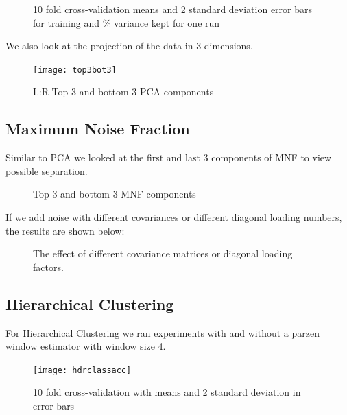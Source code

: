 \documentclass[conference,onecolumn]{IEEEtran}
\begin{document}
\begin{figure}[H]
	\centering
	\qquad
	\caption{10 fold cross-validation means and 2 standard deviation error bars for training and $\%$ variance kept for one run}
\end{figure}

We also look at the projection of the data in 3 dimensions.
\begin{figure}[H]
	\centering
	\texttt{[image: top3bot3]}
	\caption{L:R Top 3 and bottom 3 PCA components}
	\label{PCAEXP3D}
\end{figure}

\subsection{Maximum Noise Fraction}
Similar to PCA we looked at the first and last 3 components of MNF to view possible separation.

\begin{figure}[H]
	\centering
	\qquad
	\caption{Top 3 and bottom 3 MNF components}
\end{figure}

If we add noise with different covariances or different diagonal loading numbers, the results are shown below:
\begin{figure}[H]
	\centering
	\qquad
	\caption{The effect of different covariance matrices or diagonal loading factors. }
\end{figure}


\subsection{Hierarchical Clustering}
For Hierarchical Clustering we ran experiments with and without a parzen window estimator with window size 4.
\begin{figure}[H]
	\centering
	\texttt{[image: hdrclassacc]}
	\caption{10 fold cross-validation with means and 2 standard deviation in error bars}
	\label{HDREXP}
\end{figure}
\end{document}
